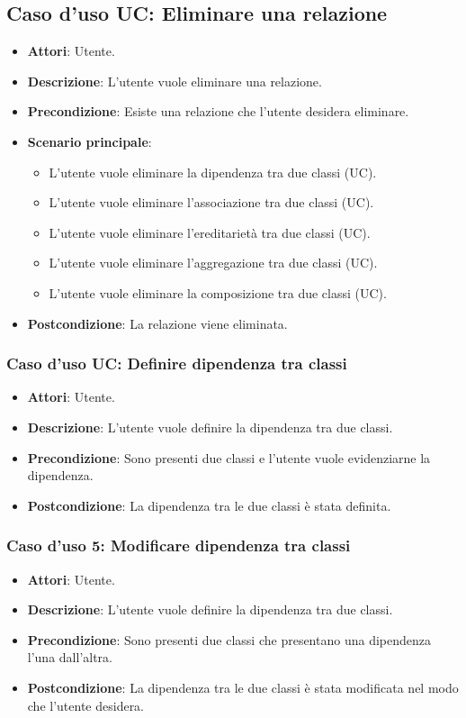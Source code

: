 \documentclass[../AnalisiDeiRequisiti.tex]{subfiles}
\begin{document}
		\subsection{Caso d'uso UC: Eliminare una relazione}
		\begin{itemize}
			\item\textbf{Attori}: Utente.
			\item\textbf{Descrizione}: L'utente vuole eliminare una relazione.
			\item\textbf{Precondizione}: Esiste una relazione che l'utente desidera eliminare.
			\item\textbf{Scenario principale}: 
			\begin{itemize}
				\item L'utente vuole eliminare la dipendenza tra due classi (UC).
				\item L'utente vuole eliminare l'associazione tra due classi (UC).
				\item L'utente vuole eliminare l'ereditarietà tra due classi (UC).
				\item L'utente vuole eliminare l'aggregazione tra due classi (UC).
				\item L'utente vuole eliminare la composizione tra due classi (UC).
			\end{itemize}
			\item\textbf{Postcondizione}: La relazione viene eliminata.
		\end{itemize}
		
		\subsubsection{Caso d'uso UC: Definire dipendenza tra classi}
		\begin{itemize}
			\item\textbf{Attori}: Utente.
			\item\textbf{Descrizione}: L'utente vuole definire la dipendenza tra due classi.
			\item\textbf{Precondizione}: Sono presenti due classi e l'utente vuole evidenziarne la dipendenza.
			\item\textbf{Postcondizione}: La dipendenza tra le due classi è stata definita.
		\end{itemize}
		
		\subsubsection{Caso d'uso 5: Modificare dipendenza tra classi}
		\begin{itemize}
			\item\textbf{Attori}: Utente.
			\item\textbf{Descrizione}: L'utente vuole definire la dipendenza tra due classi.
			\item\textbf{Precondizione}: Sono presenti due classi che presentano una dipendenza l'una dall'altra.
			\item\textbf{Postcondizione}: La dipendenza tra le due classi è stata modificata nel modo che l'utente desidera.
		\end{itemize}
		
\end{document}
